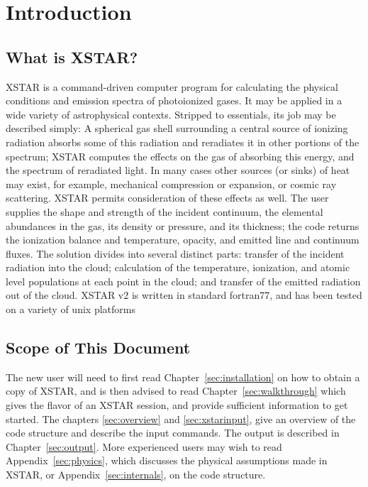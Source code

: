 
\chapter{Introduction}
\label{sec:introduction}

\section{What is XSTAR?}

XSTAR is a command-driven computer program for calculating
the physical conditions and emission spectra of photoionized gases.
It may be applied in a wide variety of astrophysical
contexts.  Stripped to essentials, its job may be described simply:
A spherical gas shell surrounding a central source of ionizing radiation
absorbs some of this radiation and reradiates it in other portions of
the spectrum; XSTAR computes the effects on the gas of absorbing this
energy, and the spectrum of reradiated light.  In many cases other sources
(or sinks) of heat may exist, for example, mechanical compression or
expansion, or cosmic ray scattering.  XSTAR permits consideration
of these effects as well.  The user supplies the shape and strength
of the incident continuum, the elemental abundances in the gas, its
density or pressure, and its thickness; the code 
returns the ionization balance and temperature,
opacity, and emitted line and continuum fluxes.
The solution divides into several distinct parts: transfer of
the incident radiation into the cloud; calculation of the temperature,
ionization, and atomic level populations at each point in the cloud; and transfer of the emitted radiation
out of the cloud.
XSTAR v2 is written in standard fortran77, and has been tested on a 
variety of unix platforms

\section{Scope of This Document}

The new user will need to first read Chapter~\ref{sec:installation} on how to obtain a copy
of XSTAR, and is then advised to read Chapter~\ref{sec:walkthrough} which gives 
the flavor of an XSTAR session, and provide sufficient information to get started.
The chapters \ref{sec:overview} and \ref{sec:xstarinput}, give an overview of
the code structure and describe the input commands.
The output is described in Chapter~\ref{sec:output}.  More experienced users may wish to read 
Appendix~\ref{sec:physics}, which
discusses the physical assumptions made in XSTAR, or 
Appendix~\ref{sec:internals}, on the code structure.


